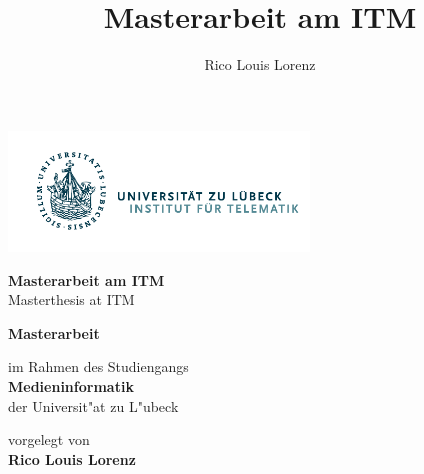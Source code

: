 \documentclass[
	ngerman,
	11pt,
	twoside,
	a4paper,
	headsepline,
	footsepline, 
	toc=bib
]{scrbook}
\begin{document}
\begin{titlepage}

\title{Masterarbeit am ITM}
\author{Rico Louis Lorenz}

{\Large
	\includegraphics[width=80mm]{images/Logo_Inst_Telematik_cropped.pdf}
	\vskip 44pt


	\textbf{\LARGE Masterarbeit am ITM}\\
	\LARGE Masterthesis at ITM

	\titlepageskip
	\textbf{Masterarbeit}

	\titlepageskip
	im Rahmen des Studiengangs\\
	\textbf{Medieninformatik}\\
	der Universit"at zu L"ubeck

	\titlepageskip
	vorgelegt von\\
	\textbf{Rico Louis Lorenz}

}
\end{titlepage}
\end{document}
